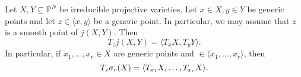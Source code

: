 \begin{lemma}
\label{geometrySecants-lemma-terracini}
    Let $X, Y \subseteq \mathbb{P}^N$ be irreducible projective varieties. Let $x \in X, y \in Y$ be generic points and let $z \in \langle x,y \rangle$ be a generic point. In particular, we may assume that $z$ is a smooth point of $j(X,Y)$. Then
    \[
        T_{z} j(X,Y) = \langle T_x X , T_y Y\rangle.
    \]
    In particular, if $x_1,\ldots,x_r \in X$ are generic points and $ \in \langle x_1,\ldots,x_r \rangle$, then  
    \[
        T_z \sigma_r(X) = \langle T_{x_1} X , \ldots , T_{x_r} X\rangle.
    \]
\end{lemma}


